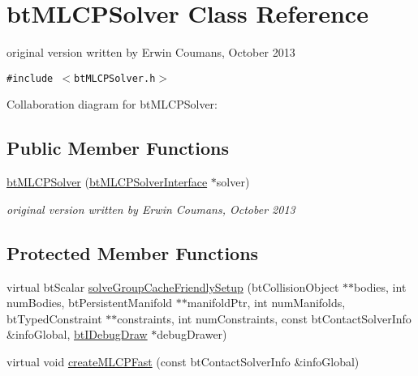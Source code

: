 \hypertarget{classbt_m_l_c_p_solver}{
\section{btMLCPSolver Class Reference}
\label{classbt_m_l_c_p_solver}
}
original version written by Erwin Coumans, October 2013  


{\tt \#include $<$btMLCPSolver.h$>$}

Collaboration diagram for btMLCPSolver:\subsection*{Public Member Functions}
\begin{CompactItemize}
\item 
\hypertarget{classbt_m_l_c_p_solver_c699f0a59f0b730ac39658ee2903b042}{
\hyperlink{classbt_m_l_c_p_solver_c699f0a59f0b730ac39658ee2903b042}{btMLCPSolver} (\hyperlink{classbt_m_l_c_p_solver_interface}{btMLCPSolverInterface} $\ast$solver)}
\label{classbt_m_l_c_p_solver_c699f0a59f0b730ac39658ee2903b042}

\begin{CompactList}\small\item\em original version written by Erwin Coumans, October 2013 \item\end{CompactList}\end{CompactItemize}
\subsection*{Protected Member Functions}
\begin{CompactItemize}
\item 
virtual btScalar \hyperlink{classbt_m_l_c_p_solver_a465e167537eceb89f7125d3bb2d5321}{solveGroupCacheFriendlySetup} (btCollisionObject $\ast$$\ast$bodies, int numBodies, btPersistentManifold $\ast$$\ast$manifoldPtr, int numManifolds, btTypedConstraint $\ast$$\ast$constraints, int numConstraints, const btContactSolverInfo \&infoGlobal, \hyperlink{classbt_i_debug_draw}{btIDebugDraw} $\ast$debugDrawer)
\item 
virtual void \hyperlink{classbt_m_l_c_p_solver_b36b9b3bf2bbbd1de7db27ba109e0a8a}{createMLCPFast} (const btContactSolverInfo \&infoGlobal)
\end{CompactItemize}
